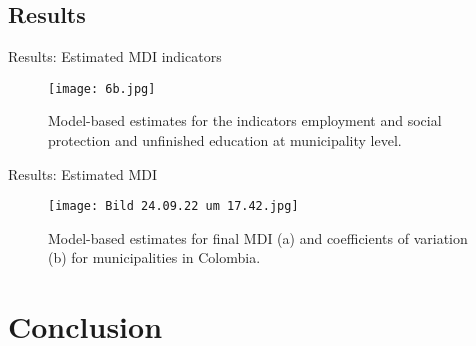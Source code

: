 \documentclass [xcolor=svgnames, t, 9pt] {beamer}
\begin{document}
\subsection{Results}


\begin{frame}{Results: Estimated MDI indicators}


\begin{figure}[htp]
    \centering
    \texttt{[image: 6b.jpg]}\hspace*{-1cm}
    \caption{Model-based estimates for the indicators employment and social protection and unfinished education at municipality level.}
\end{figure}


\end{frame}







\begin{frame}{Results: Estimated MDI}


\begin{figure}[htp]
    \centering
    \texttt{[image: Bild 24.09.22 um 17.42.jpg]}
    \caption{Model-based estimates for final MDI (a) and coefficients of variation (b) for municipalities in Colombia.}
\end{figure}

\end{frame}

\section{Conclusion}

\end{document}
